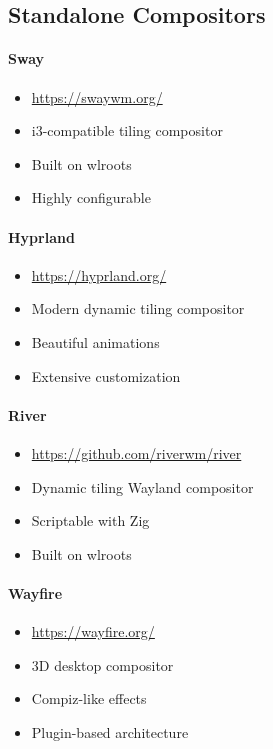 \subsection{Standalone Compositors}

\paragraph{Sway}
\begin{itemize}
    \item \url{https://swaywm.org/}
    \item i3-compatible tiling compositor
    \item Built on wlroots
    \item Highly configurable
\end{itemize}

\paragraph{Hyprland}
\begin{itemize}
    \item \url{https://hyprland.org/}
    \item Modern dynamic tiling compositor
    \item Beautiful animations
    \item Extensive customization
\end{itemize}

\paragraph{River}
\begin{itemize}
    \item \url{https://github.com/riverwm/river}
    \item Dynamic tiling Wayland compositor
    \item Scriptable with Zig
    \item Built on wlroots
\end{itemize}

\paragraph{Wayfire}
\begin{itemize}
    \item \url{https://wayfire.org/}
    \item 3D desktop compositor
    \item Compiz-like effects
    \item Plugin-based architecture
\end{itemize}

